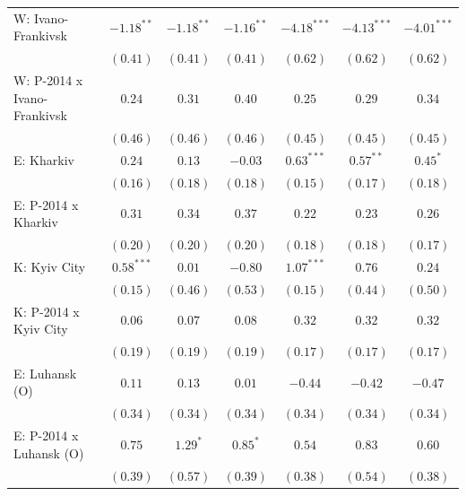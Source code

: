 \begin{table}
\begin{center}
\begin{small}
\begin{tabular}{l c c c c c c}
W: Ivano-Frankivsk          & $-1.18^{**}$  & $-1.18^{**}$ & $-1.16^{**}$   & $-4.18^{***}$ & $-4.13^{***}$ & $-4.01^{***}$ \\
                            & $(0.41)$      & $(0.41)$     & $(0.41)$       & $(0.62)$      & $(0.62)$      & $(0.62)$      \\
W: P-2014 x Ivano-Frankivsk & $0.24$        & $0.31$       & $0.40$         & $0.25$        & $0.29$        & $0.34$        \\
                            & $(0.46)$      & $(0.46)$     & $(0.46)$       & $(0.45)$      & $(0.45)$      & $(0.45)$      \\
E: Kharkiv                  & $0.24$        & $0.13$       & $-0.03$        & $0.63^{***}$  & $0.57^{**}$   & $0.45^{*}$    \\
                            & $(0.16)$      & $(0.18)$     & $(0.18)$       & $(0.15)$      & $(0.17)$      & $(0.18)$      \\
E: P-2014 x Kharkiv         & $0.31$        & $0.34$       & $0.37$         & $0.22$        & $0.23$        & $0.26$        \\
                            & $(0.20)$      & $(0.20)$     & $(0.20)$       & $(0.18)$      & $(0.18)$      & $(0.17)$      \\
K: Kyiv City                & $0.58^{***}$  & $0.01$       & $-0.80$        & $1.07^{***}$  & $0.76$        & $0.24$        \\
                            & $(0.15)$      & $(0.46)$     & $(0.53)$       & $(0.15)$      & $(0.44)$      & $(0.50)$      \\
K: P-2014 x Kyiv City       & $0.06$        & $0.07$       & $0.08$         & $0.32$        & $0.32$        & $0.32$        \\
                            & $(0.19)$      & $(0.19)$     & $(0.19)$       & $(0.17)$      & $(0.17)$      & $(0.17)$      \\
E: Luhansk (O)              & $0.11$        & $0.13$       & $0.01$         & $-0.44$       & $-0.42$       & $-0.47$       \\
                            & $(0.34)$      & $(0.34)$     & $(0.34)$       & $(0.34)$      & $(0.34)$      & $(0.34)$      \\
E: P-2014 x Luhansk (O)     & $0.75$        & $1.29^{*}$   & $0.85^{*}$     & $0.54$        & $0.83$        & $0.60$        \\
                            & $(0.39)$      & $(0.57)$     & $(0.39)$       & $(0.38)$      & $(0.54)$      & $(0.38)$      \\

\end{tabular}
\end{small}
\end{center}
\end{table}
